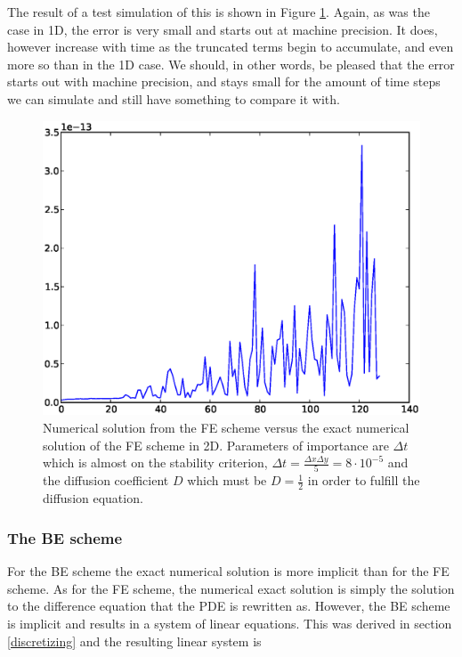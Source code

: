 The result of a test simulation of this is shown in Figure \ref{exact_numerical_2d_n130}. 
Again, as was the case in 1D, the error is very small and starts out at machine precision. It does, however increase with time as the truncated terms begin to accumulate, and even more so than in the 1D case. 
We should, in other words, be pleased that the error starts out with machine precision, and stays small for the amount of time steps we can simulate and still have something to compare it with.


\begin{figure}[H]
 \centering
 \includegraphics[scale=0.7]{Figures/exact_numerical_2d_n130.eps}
 \caption[Numerical exact error plot FE in 2D]{Numerical solution from the FE scheme versus the exact numerical solution of the FE scheme in 2D. 
 Parameters of importance are $\Delta t$ which is almost on the stability criterion, $\Delta t = \frac{\Delta x \Delta y}{5} = 8\cdot10^{-5}$ and the diffusion coefficient $D$ which must be $D = \frac{1}{2}$ in order to fulfill the diffusion equation.}
 \label{exact_numerical_2d_n130}
\end{figure}

\subsubsection{The BE scheme}
For the BE scheme the exact numerical solution is more implicit than for the FE scheme. 
As for the FE scheme, the numerical exact solution is simply the solution to the difference equation that the PDE is rewritten as. 
However, the BE scheme is implicit and results in a system of linear equations. 
This was derived in section \ref{discretizing} and the resulting linear system is

